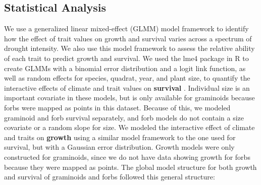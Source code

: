\documentclass[12pt, letterpaper]{article}
\newcommand{\pkg}[1]{{\fontseries{b}\selectfont #1}}
\begin{document}
\subsection{Statistical Analysis} 
We use a generalized linear mixed-effect (GLMM) model framework to identify how the effect of trait values on growth and survival varies across a spectrum of drought intensity. We also use this model framework to assess the relative ability of each trait to predict growth and survival. We used the \pkg{lme4} package in \textsf{R} to create GLMMs with a binomial error distribution and a logit link function, as well as random effects for species, quadrat, year, and plant size, to quantify the interactive effects of climate and trait values on \textbf{survival} \citep{RCoreTeam2019, Bates2015}. Individual size is an important covariate in these models, but is only available for graminoids because forbs were mapped as points in this dataset. Because of this, we modeled graminoid and forb survival separately, and forb models do not contain a size covariate or a random slope for size. We modeled the interactive effect of climate and traits on \textbf{growth} using a similar model framework to the one used for survival, but with a Gaussian error distribution. Growth models were only constructed for graminoids, since we do not have data showing growth for forbs because they were mapped as points. The global model structure for both growth and survival of graminoids and forbs followed this  general structure:
\end{document}
